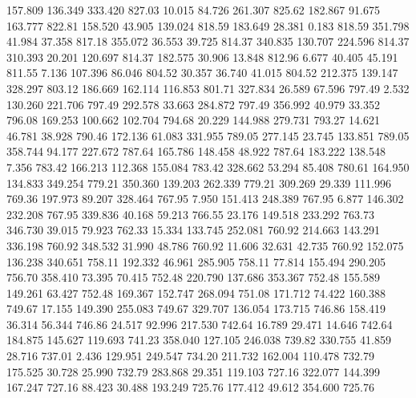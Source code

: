  157.809  136.349  333.420       827.03
  10.015   84.726  261.307       825.62
 182.867   91.675  163.777       822.81
 158.520   43.905  139.024       818.59
 183.649   28.381    0.183       818.59
 351.798   41.984   37.358       817.18
 355.072   36.553   39.725       814.37
 340.835  130.707  224.596       814.37
 310.393   20.201  120.697       814.37
 182.575   30.906   13.848       812.96
   6.677   40.405   45.191       811.55
   7.136  107.396   86.046       804.52
  30.357   36.740   41.015       804.52
 212.375  139.147  328.297       803.12
 186.669  162.114  116.853       801.71
 327.834   26.589   67.596       797.49
   2.532  130.260  221.706       797.49
 292.578   33.663  284.872       797.49
 356.992   40.979   33.352       796.08
 169.253  100.662  102.704       794.68
  20.229  144.988  279.731       793.27
  14.621   46.781   38.928       790.46
 172.136   61.083  331.955       789.05
 277.145   23.745  133.851       789.05
 358.744   94.177  227.672       787.64
 165.786  148.458   48.922       787.64
 183.222  138.548    7.356       783.42
 166.213  112.368  155.084       783.42
 328.662   53.294   85.408       780.61
 164.950  134.833  349.254       779.21
 350.360  139.203  262.339       779.21
 309.269   29.339  111.996       769.36
 197.973   89.207  328.464       767.95
   7.950  151.413  248.389       767.95
   6.877  146.302  232.208       767.95
 339.836   40.168   59.213       766.55
  23.176  149.518  233.292       763.73
 346.730   39.015   79.923       762.33
  15.334  133.745  252.081       760.92
 214.663  143.291  336.198       760.92
 348.532   31.990   48.786       760.92
  11.606   32.631   42.735       760.92
 152.075  136.238  340.651       758.11
 192.332   46.961  285.905       758.11
  77.814  155.494  290.205       756.70
 358.410   73.395   70.415       752.48
 220.790  137.686  353.367       752.48
 155.589  149.261   63.427       752.48
 169.367  152.747  268.094       751.08
 171.712   74.422  160.388       749.67
  17.155  149.390  255.083       749.67
 329.707  136.054  173.715       746.86
 158.419   36.314   56.344       746.86
  24.517   92.996  217.530       742.64
  16.789   29.471   14.646       742.64
 184.875  145.627  119.693       741.23
 358.040  127.105  246.038       739.82
 330.755   41.859   28.716       737.01
   2.436  129.951  249.547       734.20
 211.732  162.004  110.478       732.79
 175.525   30.728   25.990       732.79
 283.868   29.351  119.103       727.16
 322.077  144.399  167.247       727.16
  88.423   30.488  193.249       725.76
 177.412   49.612  354.600       725.76
